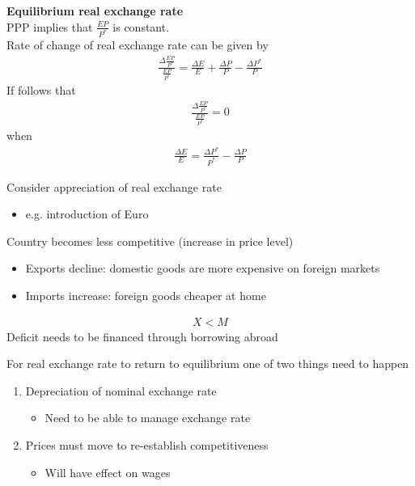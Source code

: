 \documentclass{beamer}
\begin{document}
\begin{frame}
  \textbf{Equilibrium real exchange rate}\\
  PPP implies that $\frac{EP}{P^*}$ is constant.\\
  Rate of change of real exchange rate can be given by
  \begin{align}
    \frac{\Delta \frac{EP}{P^*}}{\frac{EP}{P^*}}=  \frac{\Delta E}{E} + \frac{\Delta P}{P} - \frac{\Delta P^*}{P}
  \end{align}
  If follows that
  \begin{align}
    \frac{\Delta \frac{EP}{P^*}}{\frac{EP}{P^*}}=0
  \end{align}
  when
  \begin{align}
    \frac{\Delta E}{E} = \frac{\Delta P^*}{P^*} - \frac{\Delta P}{P}
  \end{align}
\end{frame}


\begin{frame}   
  Consider appreciation of real exchange rate
  \begin{itemize}
    \item e.g. introduction of Euro
  \end{itemize}
  \medskip
  Country becomes less competitive (increase in price level)
  \begin{itemize}
    \item Exports decline: domestic goods are more expensive on foreign markets
    \item Imports increase: foreign goods cheaper at home
  \end{itemize}
  \begin{align}
    X<M
  \end{align}
  \medskip
  Deficit needs to be financed through borrowing abroad  
\end{frame}

\begin{frame}
  For real exchange rate to return to equilibrium one of two things need to happen
  \medskip
  \begin{enumerate}
    \item Depreciation of nominal exchange rate
    \begin{itemize}
      \item Need to be able to manage exchange rate
    \end{itemize}
    \medskip
    \item Prices must move to re-establish competitiveness
    \begin{itemize}
      \item Will have effect on wages
    \end{itemize}
  \end{enumerate}
\end{frame}
\end{document}
